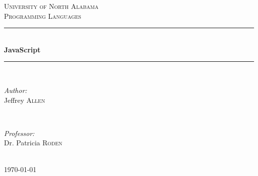 \documentclass[12pt]{scrreprt}
\begin{document}
 

\begin{titlepage}

\newcommand{\HRule}{\rule{\linewidth}{0.5mm}} %

\center %


\textsc{\LARGE University of North Alabama}\\[1.5cm] %
\textsc{\Large Programming Languages}\\[0.5cm] %


\HRule \\[0.4cm]
{ \huge \bfseries JavaScript}\\[0.4cm] %
\HRule \\[1.5cm]
 

\begin{minipage}{0.4\textwidth}
\begin{flushleft} \large
\emph{Author:}\\
Jeffrey \textsc{Allen}
\end{flushleft}
\end{minipage}
~
\begin{minipage}{0.4\textwidth}
\begin{flushright} \large
\emph{Professor:} \\
Dr. Patricia \textsc{Roden}
\end{flushright}
\end{minipage}\\[4cm]

{\large \today}\\[3cm] %

\vfill %

\end{titlepage}
\end{document}

